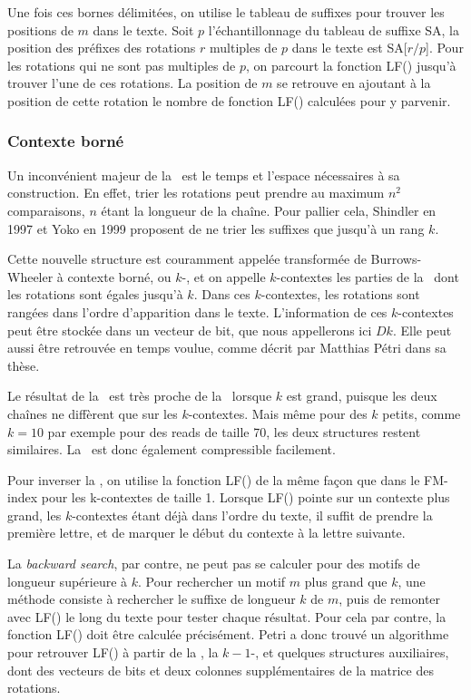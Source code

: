 Une fois ces bornes délimitées, on utilise le tableau de suffixes pour trouver les positions de $m$ dans le texte. Soit $p$ l'échantillonnage du tableau de suffixe SA, la position des préfixes des rotations $r$ multiples de $p$ dans le texte est SA[$r/p$]. Pour les rotations qui ne sont pas multiples de $p$, on parcourt la fonction LF() jusqu'à trouver l'une de ces rotations. La position de $m$ se retrouve en ajoutant à la position de cette rotation le nombre de fonction LF() calculées pour y parvenir.

\subsubsection{Contexte borné}
Un inconvénient majeur de la \bwt\ est le temps et l'espace nécessaires à sa construction. En effet, trier les rotations peut prendre au maximum $n^{2}$ comparaisons, $n$ étant la longueur de la chaîne.
Pour pallier cela, Shindler en 1997 et Yoko en 1999 proposent de ne trier les suffixes que jusqu'à un rang $k$. 

Cette nouvelle structure est couramment appelée transformée de Burrows-Wheeler à contexte borné, ou $k$-\bwt, et on appelle $k$-contextes les parties de la \kbwt\ dont les rotations sont égales jusqu'à $k$. Dans ces $k$-contextes, les rotations sont rangées dans l'ordre d'apparition dans le texte. L'information de ces $k$-contextes peut être stockée dans un vecteur de bit, que nous appellerons ici $Dk$. Elle peut aussi être retrouvée en temps voulue, comme décrit par Matthias Pétri dans sa thèse.

Le résultat de la \kbwt\ est très proche de la \bwt\ lorsque $k$ est grand, puisque les deux chaînes ne diffèrent que sur les $k$-contextes. Mais même pour des $k$ petits, comme $k = 10$ par exemple pour des reads de taille 70, les deux structures restent similaires. La \kbwt\ est donc également compressible facilement.

Pour inverser la \kbwt, on utilise la fonction LF() de la même façon que dans le FM-index pour les k-contextes de taille 1. Lorsque LF() pointe sur un contexte plus grand, les $k$-contextes étant déjà dans l'ordre du texte, il suffit de prendre la première lettre, et de marquer le début du contexte à la lettre suivante.

La \textit{backward search}, par contre, ne peut pas se calculer pour des motifs de longueur supérieure à $k$. Pour rechercher un motif $m$ plus grand que $k$, une méthode consiste à rechercher le suffixe de longueur $k$ de $m$, puis de remonter avec LF() le long du texte pour tester chaque résultat. Pour cela par contre, la fonction LF() doit être calculée précisément. Petri a donc trouvé un algorithme pour retrouver LF() à partir de la \kbwt, la $k-1$-\bwt, et quelques structures auxiliaires, dont des vecteurs de bits et deux colonnes supplémentaires de la matrice des rotations.

